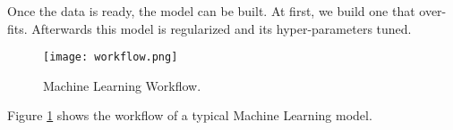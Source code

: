Once the data is ready, the model can be built. At first, we build one that over-fits. Afterwards this model is regularized and its hyper-parameters tuned. 

\begin{figure}[h!]
	\texttt{[image: workflow.png]}
	\caption{Machine Learning Workflow.\protect\cite{division_2000, charfeddine2020reviewing, krose1993introduction}}
	\label{fig:workflow}
\end{figure}

Figure \ref{fig:workflow} shows the workflow of a typical Machine Learning model.
